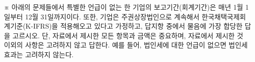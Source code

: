 \begin{framedtext}
※ 아래의 문제들에서 특별한 언급이 없는 한 기업의 보고기간(회계기간)은 매년 1월 1일부터 12월 31일까지이다. 또한, 기업은 주권상장법인으로 계속해서 한국채택국제회계기준(K-IFRS)을 적용해오고 있다고 가정하고, 답지항 중에서 물음에 가장 합당한 답을 고르시오. 단, 자료에서 제시한 모든 항목과 금액은 중요하며, 자료에서 제시한 것 이외의 사항은 고려하지 않고 답한다. 예를 들어, 법인세에 대한 언급이 없으면 법인세 효과는 고려하지 않는다. \par
\end{framedtext}

